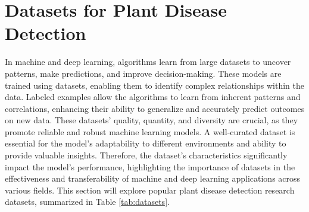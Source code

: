 \documentclass[sn-mathphys]{sn-jnl}
\theoremstyle{thmstyleone}%
\theoremstyle{thmstyletwo}%
\theoremstyle{thmstylethree}%
\begin{document}
\section{Datasets for Plant Disease Detection} \label{sec:evd}
In machine and deep learning, algorithms learn from large datasets to uncover patterns, make predictions, and improve decision-making. These models are trained using datasets, enabling them to identify complex relationships within the data. Labeled examples allow the algorithms to learn from inherent patterns and correlations, enhancing their ability to generalize and accurately predict outcomes on new data. These datasets' quality, quantity, and diversity are crucial, as they promote reliable and robust machine learning models. A well-curated dataset is essential for the model's adaptability to different environments and ability to provide valuable insights. Therefore, the dataset's characteristics significantly impact the model's performance, highlighting the importance of datasets in the effectiveness and transferability of machine and deep learning applications across various fields. This section will explore popular plant disease detection research datasets, summarized in Table \ref{tab:datasets}.
\end{document}
